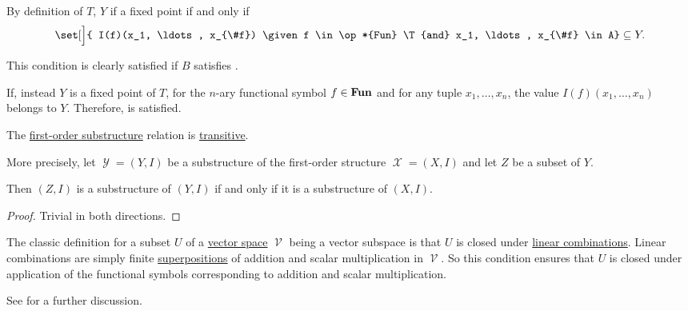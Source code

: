\begin{defproof}
   By definition of \( T \), \( Y \) if a fixed point if and only if
  \begin{equation*}
    \set[\Big]{ I(f)(x_1, \ldots, x_{\#f}) \given f \in \op*{Fun} \T{and} x_1, \ldots, x_{\#f} \in A} \subseteq Y.
  \end{equation*}

  This condition is clearly satisfied if \( B \) satisfies .

   If, instead \( Y \) is a fixed point of \( T \), for the \( n \)-ary functional symbol \( f \in \op*{Fun} \) and for any tuple \( x_1, \ldots, x_n \), the value \( I(f)(x_1, \ldots, x_n) \) belongs to \( Y \). Therefore,  is satisfied.
\end{defproof}

\begin{proposition}\label{thm:substructure_relation_is_transitive}
  The \hyperref[def:first_order_substructure]{first-order substructure} relation is \hyperref[def:binary_relation/transitive]{transitive}.

  More precisely, let \( \mscrY = (Y, I) \) be a substructure of the first-order structure \( \mscrX = (X, I) \) and let \( Z \) be a subset of \( Y \).

  Then \( (Z, I) \) is a substructure of \( (Y, I) \) if and only if it is a substructure of \( (X, I) \).
\end{proposition}
\begin{proof}
  Trivial in both directions.
\end{proof}

\begin{example}\label{ex:def:first_order_substructure/vector_space}
  The classic definition for a subset \( U \) of a \hyperref[def:vector_space]{vector space} \( \mscrV \) being a vector subspace is that \( U \) is closed under \hyperref[rem:linear_combinations]{linear combinations}. Linear combinations are simply finite \hyperref[con:function_superposition]{superpositions} of addition and scalar multiplication in \( \mscrV \). So this condition ensures that \( U \) is closed under application of the functional symbols corresponding to addition and scalar multiplication.

  See  for a further discussion.
\end{example}


